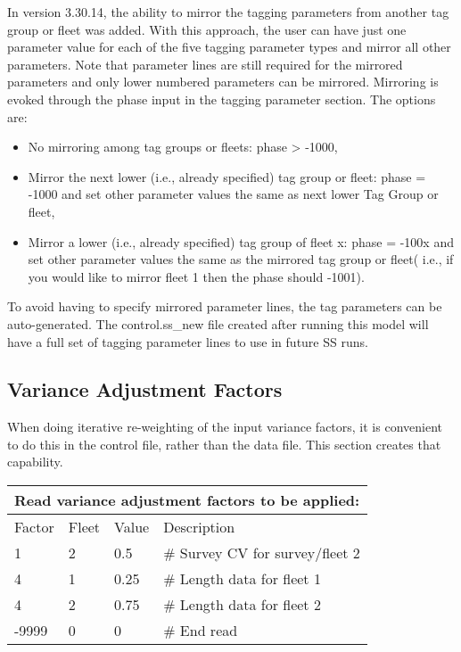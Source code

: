 In version 3.30.14, the ability to mirror the tagging parameters from another tag group or fleet was added. With this approach, the user can have just one parameter value for each of the five tagging parameter types and mirror all other parameters. Note that parameter lines are still required for the mirrored parameters and only lower numbered parameters can be mirrored. Mirroring is evoked through the phase input in the tagging parameter section.  The options are:
\begin{itemize}
	\item No mirroring among tag groups or fleets: phase > -1000,
	\item Mirror the next lower (i.e., already specified) tag group or fleet: phase = -1000 and set other parameter values the same as next lower Tag Group or fleet,
	\item Mirror a lower (i.e., already specified) tag group of fleet x: phase = -100x and set other parameter values the same as the mirrored tag group or fleet( i.e., if you would like to mirror fleet 1 then the phase should -1001).
\end{itemize}

To avoid having to specify mirrored parameter lines, the tag parameters can be auto-generated. The control.ss\_new file created after running this model will have a full set of tagging parameter lines to use in future SS runs.

\hypertarget{GcompVar}{}
\subsection{Variance Adjustment Factors}
When doing iterative re-weighting of the input variance factors, it is convenient to do this in the control file, rather than the data file.  This section creates that capability.


\begin{longtable}{p{3cm} p{3cm} p{2.5cm} p{6.25cm} }

	\multicolumn{4}{l}{Read variance adjustment factors to be applied:}\\
	\hline
	Factor & Fleet & Value & Description \Tstrut\Bstrut\\
	\hline
	1 & 2 & 0.5 & \# Survey CV for survey/fleet 2 \Tstrut\\
	4 & 1 & 0.25 & \# Length data for fleet 1 \\
	4 & 2 & 0.75 & \# Length data for fleet 2\\
	-9999 & 0 & 0 & \# End read\Bstrut\\
	\hline
\end{longtable}


